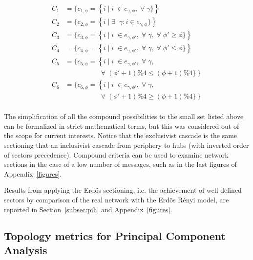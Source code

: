 \documentclass[%
 aip,
 jmp,%
 amsmath,amssymb,
 reprint,%
]{revtex4-1}
\begin{document}
\begin{equation}
\begin{split}
C_1&=\{c_{1,\phi}=\left\{i\mid i\;\in e_{\gamma,\phi}, \;\forall\; \gamma\}\right\} \\
C_2&=\{c_{2,\phi}=\left\{i\mid \exists \;\;\gamma: i \in e_{\gamma,\phi}\}\right\} \\
C_3&=\{c_{3,\phi}=\left\{i\mid i\;\in e_{\gamma,\phi'}, \;\forall\; \gamma,\;\forall\;\phi'\geq \phi\}\right\} \\
C_4&=\{c_{4,\phi}=\left\{i\mid i\;\in e_{\gamma,\phi'}, \;\forall\; \gamma,\;\forall\;\phi'\leq \phi\}\right\} \\
C_5&=\{c_{5,\phi}=\left\{i\mid i\;\in e_{\gamma,\phi'}, \;\forall\; \gamma,\right.\\
	  &\;\;\;\;\;\;\;\;\;\;\;\;\;\;\;\;\;\; \left.\;\forall\;(\phi'+1)\%4\leq (\phi+1)\%4\}\right\} \\
C_6&=\{c_{6,\phi}=\left\{i\mid i\;\in e_{\gamma,\phi'}, \;\forall\; \gamma,\right.\\
	  &\;\;\;\;\;\;\;\;\;\;\;\;\;\;\;\;\;\; \left.\;\forall\;(\phi'+1)\%4\geq (\phi+1)\%4\}\right\} \\
\end{split}
\end{equation}

The simplification of all the compound possibilities to the small set listed above can be formalized in strict mathematical terms, but this was considered out of the scope for current interests. Notice that the exclusivist cascade is the same sectioning that an inclusivist cascade from periphery to hubs (with inverted order of sectors precedence). Compound criteria can be used to examine network sections in the case of a low number of messages, such as in the last figures of Appendix~\ref{figures}.

Results from applying the Erd\"os sectioning, i.e. the achievement of well defined sectors by comparison of the real network with the Erd\"os R\'enyi model, are reported in Section~\ref{subsec:pih} and Appendix~\ref{figures}.

\subsection{Topology metrics for Principal Component Analysis}\label{measures}
\end{document}
